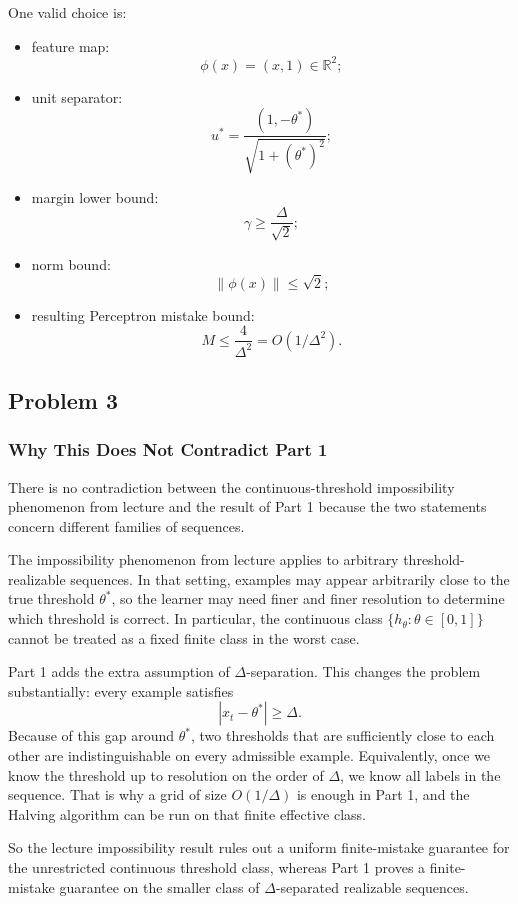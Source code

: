 \documentclass{article}
\begin{document}
One valid choice is:
\begin{itemize}
\item feature map:
$$
\phi(x) = (x,1) \in \mathbb{R}^2;
$$
\item unit separator:
$$
u^* = \frac{(1,-\theta^*)}{\sqrt{1+(\theta^*)^2}};
$$
\item margin lower bound:
$$
\gamma \geq \frac{\Delta}{\sqrt{2}};
$$
\item norm bound:
$$
\|\phi(x)\| \leq \sqrt{2};
$$
\item resulting Perceptron mistake bound:
$$
M \leq \frac{4}{\Delta^2}
= O(1/\Delta^2).
$$
\end{itemize}

\subsection{Problem 3}

\subsubsection{Why This Does Not Contradict Part 1}

There is no contradiction between the continuous-threshold impossibility phenomenon from lecture
and the result of Part 1 because the two statements concern different families of sequences.

The impossibility phenomenon from lecture applies to arbitrary threshold-realizable sequences. In
that setting, examples may appear arbitrarily close to the true threshold $\theta^*$, so the learner
may need finer and finer resolution to determine which threshold is correct. In particular, the
continuous class $\{h_\theta : \theta \in [0,1]\}$ cannot be treated as a fixed finite class in the
worst case.

Part 1 adds the extra assumption of $\Delta$-separation. This changes the problem substantially:
every example satisfies
$$
|x_t-\theta^*| \geq \Delta.
$$
Because of this gap around $\theta^*$, two thresholds that are sufficiently close to each other are
indistinguishable on every admissible example. Equivalently, once we know the threshold up to
resolution on the order of $\Delta$, we know all labels in the sequence. That is why a grid of size
$O(1/\Delta)$ is enough in Part 1, and the Halving algorithm can be run on that finite effective
class.

So the lecture impossibility result rules out a uniform finite-mistake guarantee for the unrestricted
continuous threshold class, whereas Part 1 proves a finite-mistake guarantee on the smaller class of
$\Delta$-separated realizable sequences.
\end{document}
